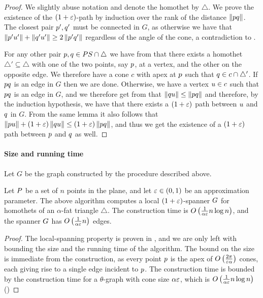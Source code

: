 \documentclass[12pt]{article}%
\begin{document}
\begin{proof}
    We slightly abuse notation and denote the homothet by
    $\triangle$. We prove the existence of the $(1+\varepsilon)$-path by
    induction over the rank of the distance $\left\| p q \right\|$. The
    closest pair $p',q'$ must be connected in $G$, as otherwise we
    have that $\left\| p' u' \right\|+\left\| q' u' \right\|\geq 2 \left\| p' q' \right\|$
    regardless of the angle of the cone, a contradiction to
    .

    For any other pair $p,q\in PS\cap \triangle$ we have from
     that there exists a homothet
    $\triangle'\subseteq \triangle$ with one of the two points, say
    $p$, at a vertex, and the other on the opposite edge. We
    therefore have a cone $c$ with apex at $p$ such that
    $q\in c\cap \triangle'$. If $pq$ is an edge in $G$ then we
    are done. Otherwise, we have a vertex $u\in c$ such that
    $pq$ is an edge in $G$, and we therefore get from
     that
    $\left\| q u \right\|\leq \left\| p q \right\|$ and therefore, by the induction
    hypothesis, we have that there exists a $(1+\varepsilon)$ path between
    $u$ and $q$ in $G$. From the same lemma it also follows that
    $\left\| p u \right\|+(1+\varepsilon)\left\| q u \right\|\leq(1+\varepsilon)\left\| p q \right\|$,
    and thus we get the existence of a $(1+\varepsilon)$ path between $p$
    and $q$ as well.

\end{proof}


\paragraph{Size and running time}
Let $G$ be the graph constructed by the procedure described above.


\begin{theorem}
    Let $P$ be a set of $n$ points in the plane, and let
    $\varepsilon \in (0,1)$ be an approximation parameter. The above
    algorithm computes a local $(1+\varepsilon)$-spanner $G$ for homothets
    of an $\alpha$-fat triangle $\triangle$.  The construction time is
    $O\left(\frac{1}{\alpha\varepsilon}n\log n\right)$, and the spanner $G$
    has $O\left(\frac{1}{\alpha\varepsilon}n\right)$ edges.
\end{theorem}

\begin{proof}
    The local-spanning property is proven in
    , and we are only left with bounding
    the size and the running time of the algorithm. The bound on the
    size is immediate from the construction, as every point $p$ is
    the apex of $O\left( \frac{2\pi}{\varepsilon\alpha} \right)$ cones, each
    giving rise to a single edge incident to $p$.  The construction
    time is bounded by the construction time for a $\theta$-graph with
    cone size $\alpha\varepsilon$, which is
    $O\left(\frac{1}{\alpha\varepsilon}n\log n\right)$ (\cite{c-aaspmp-87})
\end{proof}
\end{document}
